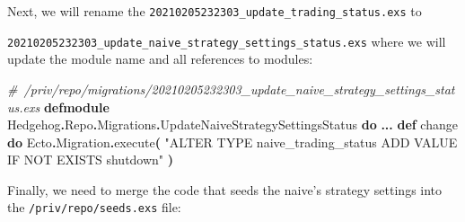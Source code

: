 \documentclass[
  oneside]{book}
\newenvironment{Shaded}{\begin{snugshade}}{\end{snugshade}}
\newcommand{\CommentTok}[1]{\textcolor[rgb]{0.56,0.35,0.01}{\textit{#1}}}
\newcommand{\ConstantTok}[1]{\textcolor[rgb]{0.56,0.35,0.01}{#1}}
\newcommand{\FunctionTok}[1]{\textcolor[rgb]{0.13,0.29,0.53}{\textbf{#1}}}
\newcommand{\KeywordTok}[1]{\textcolor[rgb]{0.13,0.29,0.53}{\textbf{#1}}}
\newcommand{\NormalTok}[1]{#1}
\newcommand{\OperatorTok}[1]{\textcolor[rgb]{0.81,0.36,0.00}{\textbf{#1}}}
\newcommand{\StringTok}[1]{\textcolor[rgb]{0.31,0.60,0.02}{#1}}
\begin{document}
Next, we will rename the \texttt{20210205232303\_update\_trading\_status.exs} to

\texttt{20210205232303\_update\_naive\_strategy\_settings\_status.exs} where we will update the module name and all references to modules:

\begin{Shaded}
\begin{Highlighting}[]
\CommentTok{\# /priv/repo/migrations/20210205232303\_update\_naive\_strategy\_settings\_status.exs}
\KeywordTok{defmodule} \ConstantTok{Hedgehog}\OperatorTok{.}\ConstantTok{Repo}\OperatorTok{.}\ConstantTok{Migrations}\OperatorTok{.}\ConstantTok{UpdateNaiveStrategySettingsStatus} \KeywordTok{do}
  \OperatorTok{...}
  \KeywordTok{def}\NormalTok{ change }\KeywordTok{do}
    \ConstantTok{Ecto}\OperatorTok{.}\ConstantTok{Migration}\OperatorTok{.}\NormalTok{execute}\FunctionTok{(}
      \StringTok{"ALTER TYPE naive\_trading\_status ADD VALUE IF NOT EXISTS \textquotesingle{}shutdown\textquotesingle{}"}
    \FunctionTok{)}
\end{Highlighting}
\end{Shaded}

Finally, we need to merge the code that seeds the naive's strategy settings into the \texttt{/priv/repo/seeds.exs} file:
\end{document}
